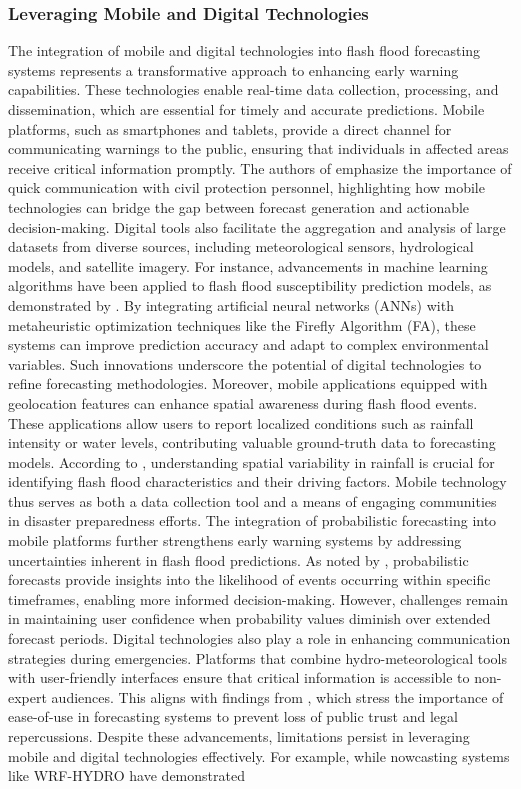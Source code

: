 \subsubsection{Leveraging Mobile and Digital Technologies}
The integration of mobile and digital technologies into flash flood forecasting systems represents a transformative approach to enhancing early warning capabilities. These technologies enable real-time data collection, processing, and dissemination, which are essential for timely and accurate predictions. Mobile platforms, such as smartphones and tablets, provide a direct channel for communicating warnings to the public, ensuring that individuals in affected areas receive critical information promptly. The authors of \citep{Silvestro2017} emphasize the importance of quick communication with civil protection personnel, highlighting how mobile technologies can bridge the gap between forecast generation and actionable decision-making. Digital tools also facilitate the aggregation and analysis of large datasets from diverse sources, including meteorological sensors, hydrological models, and satellite imagery. For instance, advancements in machine learning algorithms have been applied to flash flood susceptibility prediction models, as demonstrated by \citep{Ngo2018}. By integrating artificial neural networks (ANNs) with metaheuristic optimization techniques like the Firefly Algorithm (FA), these systems can improve prediction accuracy and adapt to complex environmental variables. Such innovations underscore the potential of digital technologies to refine forecasting methodologies. Moreover, mobile applications equipped with geolocation features can enhance spatial awareness during flash flood events. These applications allow users to report localized conditions such as rainfall intensity or water levels, contributing valuable ground-truth data to forecasting models. According to \citep{Yang2022}, understanding spatial variability in rainfall is crucial for identifying flash flood characteristics and their driving factors. Mobile technology thus serves as both a data collection tool and a means of engaging communities in disaster preparedness efforts. The integration of probabilistic forecasting into mobile platforms further strengthens early warning systems by addressing uncertainties inherent in flash flood predictions. As noted by \citep{Yussouf2020}, probabilistic forecasts provide insights into the likelihood of events occurring within specific timeframes, enabling more informed decision-making. However, challenges remain in maintaining user confidence when probability values diminish over extended forecast periods. Digital technologies also play a role in enhancing communication strategies during emergencies. Platforms that combine hydro-meteorological tools with user-friendly interfaces ensure that critical information is accessible to non-expert audiences. This aligns with findings from \citep{Silvestro2017}, which stress the importance of ease-of-use in forecasting systems to prevent loss of public trust and legal repercussions. Despite these advancements, limitations persist in leveraging mobile and digital technologies effectively. For example, while nowcasting systems like WRF-HYDRO have demonstrated 